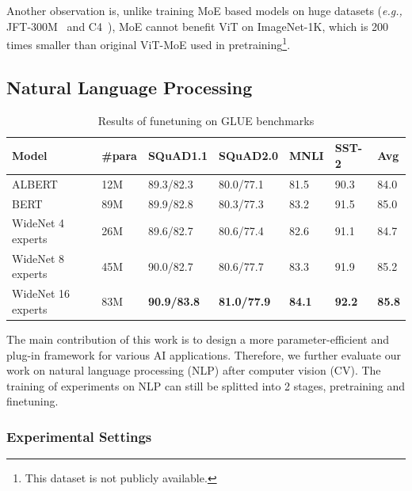 \documentclass[letterpaper]{article} %
\newcommand{\eg}{\emph{e.g.,}\xspace}
\begin{document}
Another observation is, unlike training MoE based models on huge datasets (\eg JFT-300M~\citep{sun2017revisiting} and C4~\citep{raffel2019exploring}), MoE cannot benefit ViT on ImageNet-1K, which is 200 times smaller than original ViT-MoE used in pretraining\footnote{This dataset is not publicly available.}.


\subsection{Natural Language Processing}
\label{sec:nlp}



\begin{table}[t]
\centering
\caption{Results of funetuning on GLUE benchmarks}
\label{tbl-nlp-finetune}
\begin{tabular}{l|lllll|l}
\toprule
Model                   & \#para & SQuAD1.1 & SQuAD2.0 & MNLI & SST-2  & Avg\\ \midrule
ALBERT                & 12M    & 89.3/82.3 & 80.0/77.1 & 81.5 & 90.3 & 84.0 \\
BERT                  & 89M    & 89.9/82.8 & 80.3/77.3 & 83.2 & 91.5  & 85.0\\  \midrule
WideNet 4 experts  & 26M    & 89.6/82.7 & 80.6/77.4 &  82.6 & 91.1  & 84.7 \\ 
WideNet 8 experts  & 45M    & 90.0/82.7 & 80.6/77.7 & 83.3 & 91.9 &  85.2 \\ 

WideNet 16 experts & 83M    & \textbf{90.9/83.8} & \textbf{81.0/77.9} & \textbf{84.1} & \textbf{92.2}  & \textbf{85.8}\\
\bottomrule
\end{tabular}
\end{table}









The main contribution of this work is to design a more parameter-efficient and plug-in framework for various AI applications. Therefore, we further evaluate our work on natural language processing (NLP) after computer vision (CV). The training of experiments on NLP can still be splitted into 2 stages, pretraining and finetuning. 

\subsubsection{Experimental Settings}
\label{sec:nlp-settings}
\end{document}
